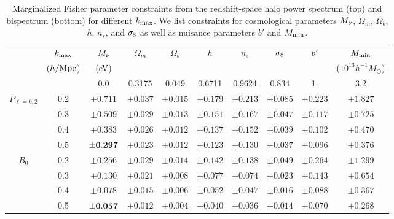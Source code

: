 \begin{table}
    \caption{Marginalized Fisher parameter constraints from the redshift-space halo power 
    spectrum (top) and bispectrum (bottom) for different $k_{\rm max}$. We list 
    constraints for cosmological parameters $M_\nu$, $\Omega_m$, $\Omega_b$, $h$, $n_s$, 
    and $\sigma_8$ as well as nuisance parameters $b'$ and $M_{\rm min}$.} 
\begin{center} 
    \begin{tabular}{cccccccccc} \toprule
         & $k_{\rm max}$ & $M_\nu$ & $\Omega_m$ & $\Omega_b$ & $h$ & $n_s$ & $\sigma_8$ & $b'$ & $M_{\rm min}$ \\
         & ({\footnotesize $h/{\rm Mpc}$}) &({\footnotesize eV}) & & & & & & & ({\footnotesize $10^{13} h^{-1}M_\odot$}) \\[3pt] \hline\hline

            &     & 0.0 & 0.3175 & 0.049 & 0.6711 & 0.9624 & 0.834 & 1. & 3.2  \\ 
$P_{\ell=0,2}$  & 0.2 & $\pm0.711$ & $\pm0.037$ & $\pm0.015$ & $\pm0.179$ & $\pm0.213$ & $\pm0.085$ & $\pm0.223$ & $\pm1.827$\\
            & 0.3 & $\pm0.509$ & $\pm0.029$ & $\pm0.013$ & $\pm0.151$ & $\pm0.167$ & $\pm0.047$ & $\pm0.117$ & $\pm0.725$\\
            & 0.4 & $\pm0.383$ & $\pm0.026$ & $\pm0.012$ & $\pm0.137$ & $\pm0.152$ & $\pm0.039$ & $\pm0.102$ & $\pm0.470$\\
            & 0.5 & $\pm{\bf 0.297}$ & $\pm0.023$ & $\pm0.012$ & $\pm0.123$ & $\pm0.130$ & $\pm0.037$ & $\pm0.096$ & $\pm0.376$\\\hline
    $B_0$  & 0.2 & $\pm0.256$ & $\pm0.029$ & $\pm0.014$ & $\pm0.142$ & $\pm0.138$ & $\pm0.049$ & $\pm0.264$ & $\pm1.299$\\
            & 0.3 & $\pm0.130$ & $\pm0.021$ & $\pm0.008$ & $\pm0.077$ & $\pm0.074$ & $\pm0.023$ & $\pm0.143$ & $\pm0.654$\\
            & 0.4 & $\pm0.078$ & $\pm0.015$ & $\pm0.006$ & $\pm0.052$ & $\pm0.047$ & $\pm0.016$ & $\pm0.088$ & $\pm0.367$\\
            & 0.5 & $\pm{\bf 0.057}$ & $\pm0.012$ & $\pm0.004$ & $\pm0.040$ & $\pm0.036$ & $\pm0.014$ & $\pm0.070$ & $\pm0.268$\\[3pt]

    \hline
\end{tabular} \label{tab:forecast}
\end{center}
\end{table}

